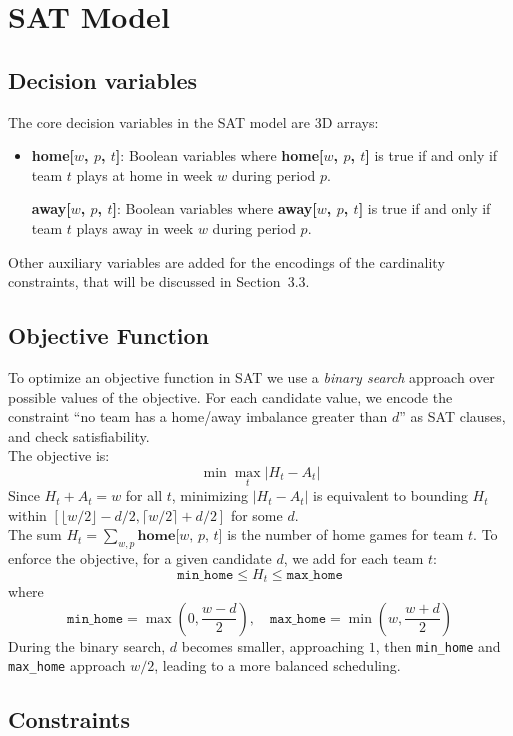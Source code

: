 \documentclass[11pt]{article}
\begin{document}
\section{SAT Model}

\subsection{Decision variables}
The core decision variables in the SAT model are 3D arrays: 
\begin{itemize}
    \item \textbf{home[$w$, $p$, $t$]}: Boolean variables where \textbf{home[$w$, $p$, $t$]} is true if and only if team $t$ plays at home in week $w$ during period $p$.

\textbf{away[$w$, $p$, $t$]}: Boolean variables where \textbf{away[$w$, $p$, $t$]} is true if and only if team $t$ plays away in week $w$ during period $p$.
\end{itemize}
Other auxiliary variables are added for the encodings of the cardinality constraints, that will be discussed in Section~3.3.

\subsection{Objective Function}

To optimize an objective function in SAT we use a \emph{binary search} approach over possible values of the objective. For each candidate value, we encode the constraint ``no team has a home/away imbalance greater than $d$'' as SAT clauses, and check satisfiability.
\\The objective is:
\[
\min \max_{t} |H_t - A_t|
\]
Since $H_t + A_t = w$ for all $t$, minimizing $|H_t - A_t|$ is equivalent to bounding $H_t$ within $[\lfloor w/2 \rfloor - d/2, \lceil w/2 \rceil + d/2]$ for some $d$.
\\
The sum $H_t = \sum_{w,p} \textbf{home[$w$, $p$, $t$]}$ is the number of home games for team $t$.
To enforce the objective, for a given candidate $d$, we add for each team $t$:
\[
\texttt{min\_home} \leq H_t \leq \texttt{max\_home}
\]
where
\[
\texttt{min\_home} = \max\left(0, \frac{w - d}{2}\right), \quad
\texttt{max\_home} = \min\left(w, \frac{w + d}{2}\right)
\]
During the binary search, $d$ becomes smaller, approaching $1$, then \texttt{min\_home} and \texttt{max\_home} approach $w/2$, leading to a more balanced scheduling.

\subsection{Constraints}
\end{document}
